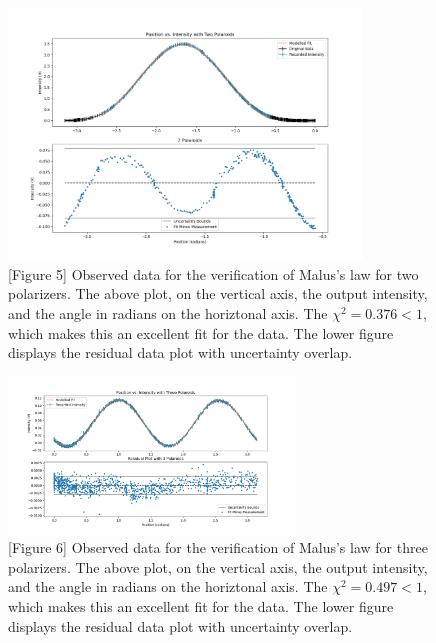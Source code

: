 \documentclass[11pt]{article}
\begin{document}
\begin{multicols}{2}
    \begin{figure}[H]
        \hspace{-25pt} 
        \includegraphics[width=3.7in]{malus_2.png}
        \caption*{[Figure 5] Observed data for the verification of Malus's law for two polarizers. The above plot, on the vertical axis, the output intensity, and the angle in radians on the horiztonal axis. The $\chi^2 = 0.376<1$, which makes this an excellent fit for the data. The lower figure displays the residual data plot with uncertainty overlap.}
        \label{fig:malus_2}
    \end{figure}

\vspace{-20pt}

    \begin{figure}[H]
        \hspace{-5pt}
        \includegraphics[width=3in]{malus_3.png}
        \caption*{[Figure 6] Observed data for the verification of Malus's law for three polarizers. The above plot, on the vertical axis, the output intensity, and the angle in radians on the horiztonal axis. The $\chi^2 = 0.497<1$, which makes this an excellent fit for the data. The lower figure displays the residual data plot with uncertainty overlap. }
        \label{fig:malus_3}
    \end{figure}


\end{multicols}
\end{document}
